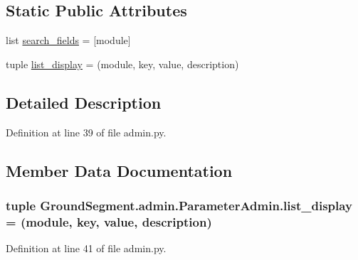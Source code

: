 \subsection*{Static Public Attributes}
\begin{DoxyCompactItemize}
\item 
list \hyperlink{class_ground_segment_1_1admin_1_1_parameter_admin_aa50da80cc9ee5d5dcbad140ad78d5cf7}{search\+\_\+fields} = \mbox{[}\textquotesingle{}module\textquotesingle{}\mbox{]}
\item 
tuple \hyperlink{class_ground_segment_1_1admin_1_1_parameter_admin_ace74aa316d4bd8e2fa1737dc689fcde3}{list\+\_\+display} = (\textquotesingle{}module\textquotesingle{}, \textquotesingle{}key\textquotesingle{}, \textquotesingle{}value\textquotesingle{}, \textquotesingle{}description\textquotesingle{})
\end{DoxyCompactItemize}


\subsection{Detailed Description}


Definition at line 39 of file admin.\+py.



\subsection{Member Data Documentation}
\hypertarget{class_ground_segment_1_1admin_1_1_parameter_admin_ace74aa316d4bd8e2fa1737dc689fcde3}{}
\subsubsection[{list\+\_\+display}]{\setlength{\rightskip}{0pt plus 5cm}tuple Ground\+Segment.\+admin.\+Parameter\+Admin.\+list\+\_\+display = (\textquotesingle{}module\textquotesingle{}, \textquotesingle{}key\textquotesingle{}, \textquotesingle{}value\textquotesingle{}, \textquotesingle{}description\textquotesingle{})\hspace{0.3cm}{\ttfamily [static]}}\label{class_ground_segment_1_1admin_1_1_parameter_admin_ace74aa316d4bd8e2fa1737dc689fcde3}


Definition at line 41 of file admin.\+py.


